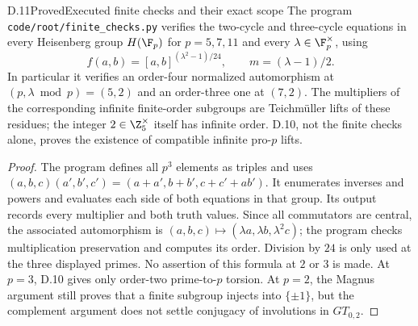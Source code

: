 \begin{claim}{D.11}{Proved}{Executed finite checks and their exact scope}
The program \texttt{code/root/finite\_checks.py} verifies the two-cycle and three-cycle equations in every Heisenberg group $H(\F_p)$ for $p=5,7,11$ and every $\lambda\in\F_p^\times$, using
\[
 f(a,b)=[a,b]^{(\lambda^2-1)/24},\qquad
 m=(\lambda-1)/2.
\]
In particular it verifies an order-four normalized automorphism at $(p,\lambda\bmod p)=(5,2)$ and an order-three one at $(7,2)$. The multipliers of the corresponding infinite finite-order subgroups are Teichm\"uller lifts of these residues; the integer $2\in\Z_5^\times$ itself has infinite order. D.10, not the finite checks alone, proves the existence of compatible infinite pro-$p$ lifts.
\end{claim}
\begin{proof}
The program defines all $p^3$ elements as triples and uses
$(a,b,c)(a',b',c')=(a+a',b+b',c+c'+ab')$.
It enumerates inverses and powers and evaluates each side of both equations in that group. Its output records every multiplier and both truth values. Since all commutators are central, the associated automorphism is
$(a,b,c)\mapsto(\lambda a,\lambda b,\lambda^2c)$; the program checks multiplication preservation and computes its order. Division by $24$ is only used at the three displayed primes. No assertion of this formula at $2$ or $3$ is made. At $p=3$, D.10 gives only order-two prime-to-$p$ torsion. At $p=2$, the Magnus argument still proves that a finite subgroup injects into $\{\pm1\}$, but the complement argument does not settle conjugacy of involutions in $GT_{0,2}$.
\end{proof}


